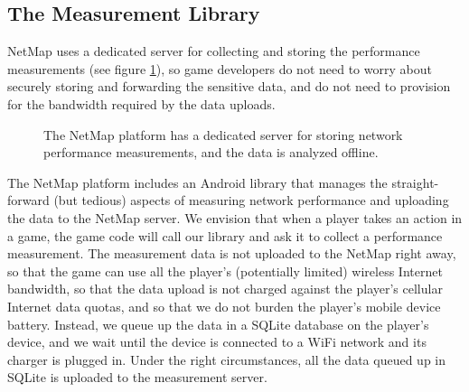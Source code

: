 \subsection{The Measurement Library}
\label{ss:dataflow}

NetMap uses a dedicated server for collecting and storing the performance
measurements (see figure \ref{fig:servers}), so game developers do not need to
worry about securely storing and forwarding the sensitive data, and do not need
to provision for the bandwidth required by the data uploads.

\begin{figure}[hbtp]
  \caption{
    The NetMap platform has a dedicated server for storing network
    performance measurements, and the data is analyzed offline.
  }
  \label{fig:servers}
\end{figure}

The NetMap platform includes an Android library that manages the
straight-forward (but tedious) aspects of measuring network performance and
uploading the data to the NetMap server. We envision that when a player takes
an action in a game, the game code will call our library and ask it to collect
a performance measurement. The measurement data is not uploaded to the NetMap
right away, so that the game can use all the player's (potentially limited)
wireless Internet bandwidth, so that the data upload is not charged against
the player's cellular Internet data quotas, and so that we do not burden the
player's mobile device battery. Instead, we queue up the data in a SQLite
database on the player's device, and we wait until the device is connected to a
WiFi network and its charger is plugged in. Under the right circumstances, all
the data queued up in SQLite is uploaded to the measurement server.

